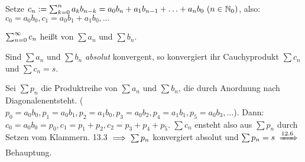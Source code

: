 \documentclass[a4paper,oneside,DIV15,BCOR12mm]{scrbook}
\begin{document}
\begin{definition}[Cauchyprodukt]
Setze $c_n := \sum_{k=0}^{n}{a_k b_{n-k}} = a_0b_n+a_1b_{n-1}+\ldots+a_nb_0\ (n\in\mathbb{N}_0)$, also: $c_0 = a_0b_0, c_1 = a_0b_1+a_1b_0, \ldots$

$\sum_{n=0}^{\infty}{c_n}$ heißt  von $\sum{a_n}$ und $\sum{b_n}$.
\end{definition}


%
%
%

\begin{satz}
Sind $\sum{a_n}$ und $\sum{b_n}$ \emph{absolut} konvergent, so konvergiert ihr Cauchyprodukt $\sum{c_n}$ und $\sum{c_n} = s$.
\end{satz}

\begin{beweis}
Sei $\sum{p_n}$ die Produktreihe von $\sum{a_n}$ und $\sum{b_n}$, die durch \glqq Anordnung nach Diagonalen\grqq entsteht. ($p_0 = a_0b_0, p_1=a_0b_1, p_2 = a_1b_0, p_3 = a_0b_2, p_4 = a_1b_1, p_5=a_0b_3, \ldots$). Dann: $c_0  =a_0b_0 = p_0, c_1=p_1+p_2, c_2 = p_3+p_4+p_5$. $\sum{c_n}$ ensteht also aus $\sum{p_n}$ durch Setzen vom Klammern. 13.3 $\implies \sum{p_n}$ konvergiert absolut und $\sum{p_n} = s \folgtnach{12.6}$ Behauptung.
\end{beweis}
\end{document}
